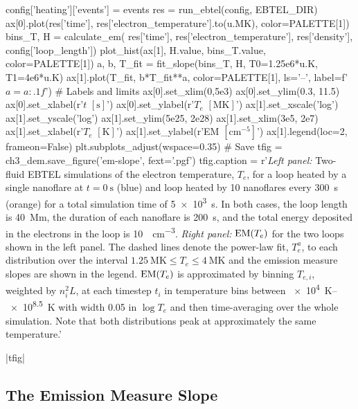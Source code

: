 \begin{pycode}
config['heating']['events'] = events
res = run_ebtel(config, EBTEL_DIR)
ax[0].plot(res['time'], res['electron_temperature'].to(u.MK), color=PALETTE[1])
bins_T, H = calculate_em(
    res['time'], res['electron_temperature'], res['density'], config['loop_length'])
plot_hist(ax[1], H.value, bins_T.value, color=PALETTE[1])
a, b, T_fit = fit_slope(bins_T, H, T0=1.25e6*u.K, T1=4e6*u.K)
ax[1].plot(T_fit, b*T_fit**a, color=PALETTE[1], ls='--', label=f'$a={a:.1f}$')
# Labels and limits
ax[0].set_xlim(0,5e3)
ax[0].set_ylim(0.3, 11.5)
ax[0].set_xlabel(r'$t$ $[\si{\second}]$')
ax[0].set_ylabel(r'$T_e$ $[\si{\mega\kelvin}]$')
ax[1].set_xscale('log')
ax[1].set_yscale('log')
ax[1].set_ylim(5e25, 2e28)
ax[1].set_xlim(3e5, 2e7)
ax[1].set_xlabel(r'$T_e$ $[\si{\kelvin}]$')
ax[1].set_ylabel(r'EM $[\si{\cm\tothe{-5}}]$')
ax[1].legend(loc=2, frameon=False)
plt.subplots_adjust(wspace=0.35)
# Save
tfig = ch3_dem.save_figure('em-slope', fext='.pgf')
tfig.caption = r'\textit{Left panel:} Two-fluid EBTEL simulations of the electron temperature, $T_e$, for a loop heated by a single nanoflare at $t=\SI{0}{\second}$ (blue) and loop heated by 10 nanoflares every \SI{300}{\second} (orange) for a total simulation time of \SI{5e3}{\second}. In both cases, the loop length is \SI{40}{\mega\m}, the duration of each nanoflare is \SI{200}{\second}, and the total energy deposited in the electrons in the loop is \SI{10}{\erg\per\cubic\cm}. \textit{Right panel:} $\textup{EM}(T_e)$ for the two loops shown in the left panel. The dashed lines denote the power-law fit, $T_e^a$, to each distribution over the interval $\SI{1.25}{\mega\kelvin}\le T_e\le\SI{4}{\mega\kelvin}$ and the emission measure slopes are shown in the legend. $\textup{EM}(T_e)$ is approximated by binning $T_{e,i}$, weighted by $n_i^2L$, at each timestep $t_i$ in temperature bins between \SIrange{e4}{e8.5}{\kelvin} with width 0.05 in $\log{T_e}$ and then time-averaging over the whole simulation. Note that both distributions peak at approximately the same temperature.'
\end{pycode}
|tfig|

\subsection{The Emission Measure Slope}\label{sec:em_slope}

